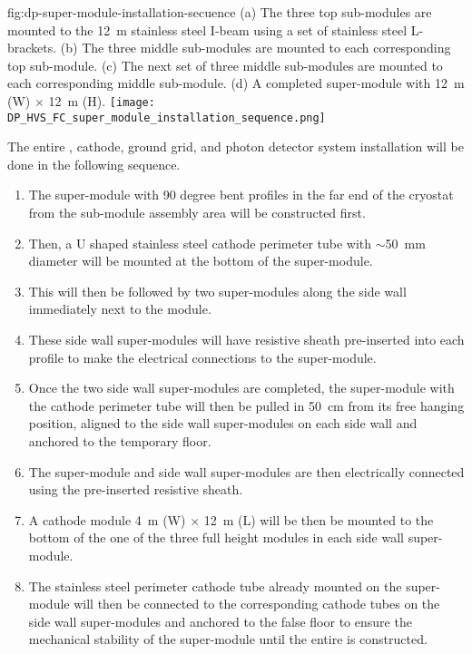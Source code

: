 \begin{dunefigure}
{fig:dp-super-module-installation-secuence}
{(a) The three top sub-modules are mounted to the \SI{12}{\m} stainless steel I-beam using a set of stainless steel L-brackets.
(b) The three middle sub-modules are mounted to each corresponding top sub-module.
(c) The next set of three middle sub-modules are mounted to each corresponding middle sub-module.
(d) A completed super-module with \SI{12}{\m} (W) $\times$ \SI{12}{\m} (H).}
\texttt{[image: DP\_HVS\_FC\_super\_module\_installation\_sequence.png]}
\end{dunefigure}

The entire , cathode, ground grid, and photon detector system installation will be done in the following sequence.
\begin{enumerate}
    \item The \endwall super-module with \num{90} degree bent profiles in the far end of the cryostat from the sub-module assembly area will be constructed first.
    \item Then, a U shaped stainless steel cathode \endwall perimeter tube with $\sim$\SI{50}{\mm} diameter will be mounted at the bottom of the \endwall super-module.
    \item This will then be followed by two super-modules along the side wall immediately next to the \endwall module.  
    \item These side wall super-modules will have resistive sheath pre-inserted into each profile to make the electrical connections to the \endwall super-module.
    \item Once the two side wall super-modules are completed, the \endwall super-module with the cathode perimeter tube will then be pulled in \SI{50}{\cm} from its free hanging position, aligned to the side wall super-modules on each side wall and anchored to the temporary floor. 
    \item The \endwall super-module and side wall super-modules are then electrically connected using the pre-inserted resistive sheath.
    \item A cathode module \SI{4}{\m} (W) $\times$ \SI{12}{\m} (L) will be then be mounted to the bottom of the one of the three full height modules in each side wall super-module.
    \item The stainless steel perimeter cathode tube already mounted on the \endwall super-module will then be connected to the corresponding cathode tubes on the side wall super-modules and anchored to the false floor to ensure the mechanical stability of the \endwall super-module until the entire  is constructed.

\end{enumerate}
